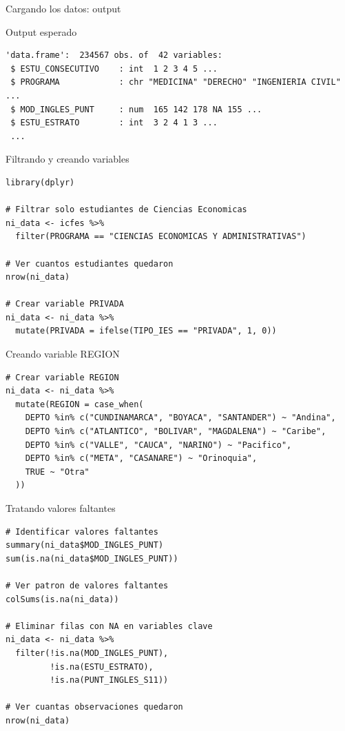 \documentclass[aspectratio=169, 11pt]{beamer}
\begin{document}
\begin{frame}[fragile]{Cargando los datos: output}
\begin{exampleblock}{Output esperado}
\small
\begin{verbatim}
'data.frame':  234567 obs. of  42 variables:
 $ ESTU_CONSECUTIVO    : int  1 2 3 4 5 ...
 $ PROGRAMA            : chr "MEDICINA" "DERECHO" "INGENIERIA CIVIL" ...
 $ MOD_INGLES_PUNT     : num  165 142 178 NA 155 ...
 $ ESTU_ESTRATO        : int  3 2 4 1 3 ...
 ...
\end{verbatim}
\end{exampleblock}
\end{frame}

\begin{frame}[fragile]{Filtrando y creando variables}
\begin{lstlisting}
library(dplyr)

# Filtrar solo estudiantes de Ciencias Economicas
ni_data <- icfes %>%
  filter(PROGRAMA == "CIENCIAS ECONOMICAS Y ADMINISTRATIVAS")

# Ver cuantos estudiantes quedaron
nrow(ni_data)

# Crear variable PRIVADA
ni_data <- ni_data %>%
  mutate(PRIVADA = ifelse(TIPO_IES == "PRIVADA", 1, 0))
\end{lstlisting}
\end{frame}

\begin{frame}[fragile]{Creando variable REGION}
\begin{lstlisting}
# Crear variable REGION
ni_data <- ni_data %>%
  mutate(REGION = case_when(
    DEPTO %in% c("CUNDINAMARCA", "BOYACA", "SANTANDER") ~ "Andina",
    DEPTO %in% c("ATLANTICO", "BOLIVAR", "MAGDALENA") ~ "Caribe",
    DEPTO %in% c("VALLE", "CAUCA", "NARINO") ~ "Pacifico",
    DEPTO %in% c("META", "CASANARE") ~ "Orinoquia",
    TRUE ~ "Otra"
  ))
\end{lstlisting}
\end{frame}

\begin{frame}[fragile]{Tratando valores faltantes}
\begin{lstlisting}
# Identificar valores faltantes
summary(ni_data$MOD_INGLES_PUNT)
sum(is.na(ni_data$MOD_INGLES_PUNT))

# Ver patron de valores faltantes
colSums(is.na(ni_data))

# Eliminar filas con NA en variables clave
ni_data <- ni_data %>%
  filter(!is.na(MOD_INGLES_PUNT),
         !is.na(ESTU_ESTRATO),
         !is.na(PUNT_INGLES_S11))

# Ver cuantas observaciones quedaron
nrow(ni_data)
\end{lstlisting}
\end{frame}
\end{document}
